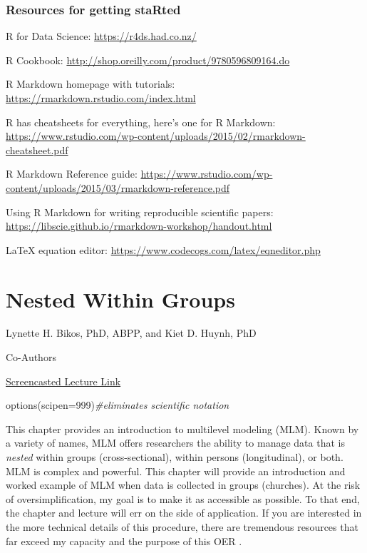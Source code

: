\documentclass[
  11pt,
]{book}
\newenvironment{Shaded}{\begin{snugshade}}{\end{snugshade}}
\newcommand{\AttributeTok}[1]{\textcolor[rgb]{0.77,0.63,0.00}{#1}}
\newcommand{\CommentTok}[1]{\textcolor[rgb]{0.56,0.35,0.01}{\textit{#1}}}
\newcommand{\DecValTok}[1]{\textcolor[rgb]{0.00,0.00,0.81}{#1}}
\newcommand{\FunctionTok}[1]{\textcolor[rgb]{0.00,0.00,0.00}{#1}}
\newcommand{\NormalTok}[1]{#1}
\begin{document}
\hypertarget{resources-for-getting-started}{%
\subsection{Resources for getting staRted}\label{resources-for-getting-started}}

R for Data Science: \url{https://r4ds.had.co.nz/}

R Cookbook: \url{http://shop.oreilly.com/product/9780596809164.do}

R Markdown homepage with tutorials: \url{https://rmarkdown.rstudio.com/index.html}

R has cheatsheets for everything, here's one for R Markdown: \url{https://www.rstudio.com/wp-content/uploads/2015/02/rmarkdown-cheatsheet.pdf}

R Markdown Reference guide: \url{https://www.rstudio.com/wp-content/uploads/2015/03/rmarkdown-reference.pdf}

Using R Markdown for writing reproducible scientific papers: \url{https://libscie.github.io/rmarkdown-workshop/handout.html}

LaTeX equation editor: \url{https://www.codecogs.com/latex/eqneditor.php}

\hypertarget{wGroups}{%
\chapter{Nested Within Groups}\label{wGroups}}

Lynette H. Bikos, PhD, ABPP, and Kiet D. Huynh, PhD

Co-Authors

\href{https://spu.hosted.panopto.com/Panopto/Pages/Viewer.aspx?pid=f24e4b50-1204-4412-a78f-ad2500198bb6}{Screencasted Lecture Link}

\begin{Shaded}
\begin{Highlighting}[]
\FunctionTok{options}\NormalTok{(}\AttributeTok{scipen=}\DecValTok{999}\NormalTok{)}\CommentTok{\#eliminates scientific notation}
\end{Highlighting}
\end{Shaded}

This chapter provides an introduction to multilevel modeling (MLM). Known by a variety of names, MLM offers researchers the ability to manage data that is \emph{nested} within groups (cross-sectional), within persons (longitudinal), or both. MLM is complex and powerful. This chapter will provide an introduction and worked example of MLM when data is collected in groups (churches). At the risk of oversimplification, my goal is to make it as accessible as possible. To that end, the chapter and lecture will err on the side of application. If you are interested in the more technical details of this procedure, there are tremendous resources that far exceed my capacity and the purpose of this OER \citep[e.g.,][]{bryk_hierarchical_1992}.
\end{document}
